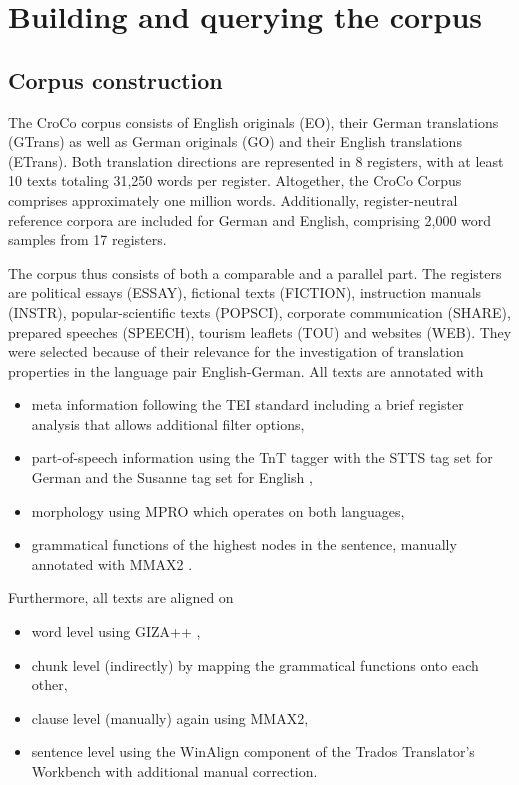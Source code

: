 \documentclass[output=paper]{LSP/langsci}
\begin{document}
\section{Building and querying the corpus}\label{sec:culo:3}
\subsection{Corpus construction}\label{sec:culo:3.1}

The CroCo corpus consists of English originals (EO), their German translations (GTrans) as well as German originals (GO) and their English translations (ETrans). Both translation directions are represented in 8 registers, with at least 10 texts totaling 31,250 words per register. Altogether, the CroCo Corpus comprises approximately one million words. Additionally, register-neutral reference corpora are included for German and English, comprising 2,000 word samples from 17 registers.

The corpus thus consists of both a comparable and a parallel part. The registers are political essays (ESSAY), fictional texts (FICTION), instruction manuals (INSTR), popular-scientific texts (POPSCI), corporate communication (SHARE), prepared speeches (SPEECH), tourism leaflets (TOU) and websites (WEB). They were selected because of their relevance for the investigation of translation properties in the language pair English-German. All texts are annotated with

\begin{itemize}
\item 
meta information following the TEI standard \citep{Sperberg-McQueen1994, Burnard2007} including a brief register analysis that allows additional filter options, 
\item 
part-of-speech information using the TnT tagger \citep{Brants2000} with the STTS tag set for German \citep{SchillerEtAl1999} and the Susanne tag set for English \citep{Sampson1995},
\item 
morphology using MPRO \citep{Maas2009} which operates on both languages,
\item
grammatical functions of the highest nodes in the sentence, manually annotated with MMAX2 \citep{Müller2006}.
\end{itemize}

Furthermore, all texts are aligned on 

\begin{itemize}
\item  
word level using GIZA++ \citep{Och2003},
\item
chunk level (indirectly) by mapping the grammatical functions onto each other,
\item 
clause level (manually) again using MMAX2,
\item 
sentence level using the WinAlign component of the Trados Translator's Workbench \citep{Heyn1996} with additional manual correction.
\end{itemize}
\end{document}
